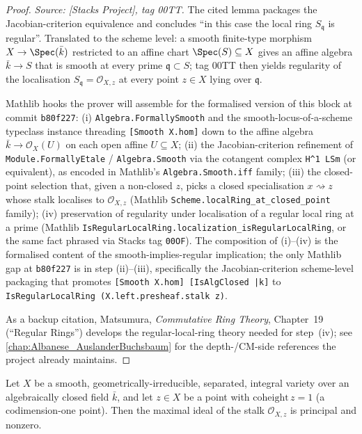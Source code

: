 \begin{proof}
  \textit{Source: [Stacks Project], tag 00TT.} The cited lemma packages the
  Jacobian-criterion equivalence and concludes ``in this case the local ring
  \(S_{\mathfrak q}\) is regular''. Translated to the scheme level: a smooth
  finite-type morphism \(X \to \Spec(\bar k)\) restricted to an affine chart
  \(\Spec(S) \subseteq X\) gives an affine algebra \(\bar k \to S\) that is
  smooth at every prime \(\mathfrak q \subset S\); tag 00TT then yields
  regularity of the localisation \(S_{\mathfrak q} = \mathcal O_{X, z}\) at every
  point \(z \in X\) lying over \(\mathfrak q\).

  Mathlib hooks the prover will assemble for the formalised version of this
  block at commit \texttt{b80f227}: (i) \texttt{Algebra.FormallySmooth} and the
  smooth-locus-of-a-scheme typeclass instance threading
  \texttt{[Smooth\,X.hom]} down to the affine algebra
  \(\bar k \to \mathcal O_X(U)\) on each open affine \(U \subseteq X\); (ii) the
  Jacobian-criterion refinement of \texttt{Module.FormallyEtale} /
  \texttt{Algebra.Smooth} via the cotangent complex \texttt{H\^{}1\,LSm} (or
  equivalent), as encoded in Mathlib's \texttt{Algebra.Smooth.iff} family; (iii)
  the closed-point selection that, given a non-closed \(z\), picks a closed
  specialisation \(x \rightsquigarrow z\) whose stalk localises to
  \(\mathcal O_{X, z}\) (Mathlib \texttt{Scheme.localRing\_at\_closed\_point}
  family); (iv) preservation of regularity under localisation of a regular
  local ring at a prime (Mathlib
  \texttt{IsRegularLocalRing.localization\_isRegularLocalRing}, or the same
  fact phrased via Stacks tag \texttt{00OF}). The composition of (i)--(iv) is
  the formalised content of the smooth-implies-regular implication; the only
  Mathlib gap at \texttt{b80f227} is in step (ii)--(iii), specifically the
  Jacobian-criterion scheme-level packaging that promotes
  \texttt{[Smooth\,X.hom]\,[IsAlgClosed\,\bar k]} to
  \texttt{IsRegularLocalRing\,(X.left.presheaf.stalk\,z)}.

  As a backup citation, Matsumura, \emph{Commutative Ring Theory}, Chapter~19
  (``Regular Rings'') develops the regular-local-ring theory needed for
  step~(iv); see \cref{chap:Albanese_AuslanderBuchsbaum} for the depth-/CM-side
  references the project already maintains.
\end{proof}

\begin{lemma}
  \label{lem:smooth_codim_one_maximalIdeal_principal}
  Let \(X\) be a smooth, geometrically-irreducible, separated, integral variety over an
  algebraically closed field \(\bar k\), and let \(z \in X\) be a point with
  \(\mathrm{coheight}\,z = 1\) (a codimension-one point). Then the maximal ideal of the
  stalk \(\mathcal O_{X,z}\) is principal and nonzero.
\end{lemma}

